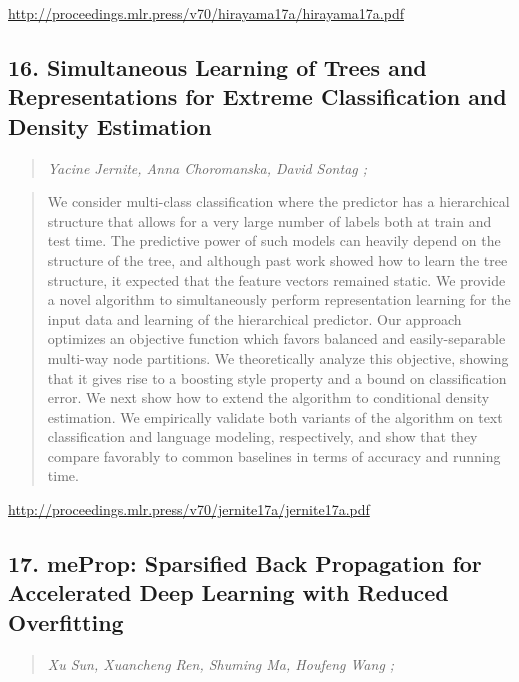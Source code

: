\documentclass{article}
\begin{document}
\href{http://proceedings.mlr.press/v70/hirayama17a/hirayama17a.pdf}{http://proceedings.mlr.press/v70/hirayama17a/hirayama17a.pdf}

\subsection{16. Simultaneous Learning of Trees and Representations for Extreme Classification and Density Estimation}

\begin{quote}
\footnotesize{\textit{Yacine Jernite, Anna Choromanska, David Sontag ;}}

\end{quote}

\begin{quote}
    We consider multi-class classification where the predictor has a hierarchical structure that allows for a very large number of labels both at train and test time. The predictive power of such models can heavily depend on the structure of the tree, and although past work showed how to learn the tree structure, it expected that the feature vectors remained static. We provide a novel algorithm to simultaneously perform representation learning for the input data and learning of the hierarchical predictor. Our approach optimizes an objective function which favors balanced and easily-separable multi-way node partitions. We theoretically analyze this objective, showing that it gives rise to a boosting style property and a bound on classification error. We next show how to extend the algorithm to conditional density estimation. We empirically validate both variants of the algorithm on text classification and language modeling, respectively, and show that they compare favorably to common baselines in terms of accuracy and running time.  
\end{quote}

\href{http://proceedings.mlr.press/v70/jernite17a/jernite17a.pdf}{http://proceedings.mlr.press/v70/jernite17a/jernite17a.pdf}

\subsection{17. meProp: Sparsified Back Propagation for Accelerated Deep Learning with Reduced Overfitting}

\begin{quote}
\footnotesize{\textit{Xu Sun, Xuancheng Ren, Shuming Ma, Houfeng Wang ;}}

\end{quote}
\end{document}
